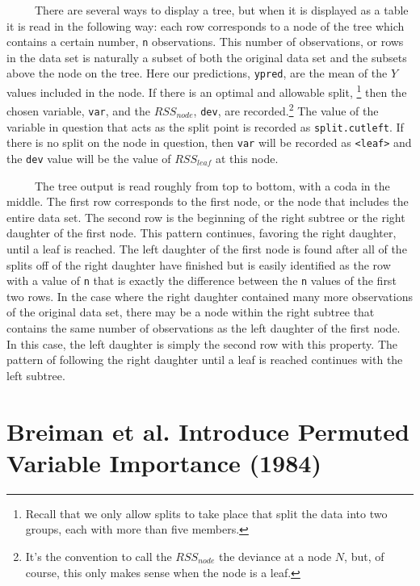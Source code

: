\documentclass[12pt,twoside]{reedthesis}
\begin{document}
  ~~~~~There are several ways to display a tree, but when it is displayed
  as a table it is read in the following way: each row corresponds to a
  node of the tree which contains a certain number, \texttt{n}
  observations. This number of observations, or rows in the data set is
  naturally a subset of both the original data set and the subsets above
  the node on the tree. Here our predictions, \texttt{ypred}, are the mean
  of the \(Y\) values included in the node. If there is an optimal and
  allowable split, \footnote{Recall that we only allow splits to take
    place that split the data into two groups, each with more than five
    members.} then the chosen variable, \texttt{var}, and the
  \(RSS_{node}\), \texttt{dev}, are recorded.\footnote{It's the convention
    to call the \(RSS_{node}\) the deviance at a node \(N\), but, of
    course, this only makes sense when the node is a leaf.} The value of
  the variable in question that acts as the split point is recorded as
  \texttt{split.cutleft}. If there is no split on the node in question,
  then \texttt{var} will be recorded as
  \texttt{\textless{}leaf\textgreater{}} and the \texttt{dev} value will
  be the value of \(RSS_{leaf}\) at this node.
  
  ~~~~~The tree output is read roughly from top to bottom, with a coda in
  the middle. The first row corresponds to the first node, or the node
  that includes the entire data set. The second row is the beginning of
  the right subtree or the right daughter of the first node. This pattern
  continues, favoring the right daughter, until a leaf is reached. The
  left daughter of the first node is found after all of the splits off of
  the right daughter have finished but is easily identified as the row
  with a value of \texttt{n} that is exactly the difference between the
  \texttt{n} values of the first two rows. In the case where the right
  daughter contained many more observations of the original data set,
  there may be a node within the right subtree that contains the same
  number of observations as the left daughter of the first node. In this
  case, the left daughter is simply the second row with this property. The
  pattern of following the right daughter until a leaf is reached
  continues with the left subtree.
  
  \section{Breiman et al. Introduce Permuted Variable Importance
  (1984)}\label{breiman-et-al.-introduce-permuted-variable-importance-1984}
  
\end{document}
